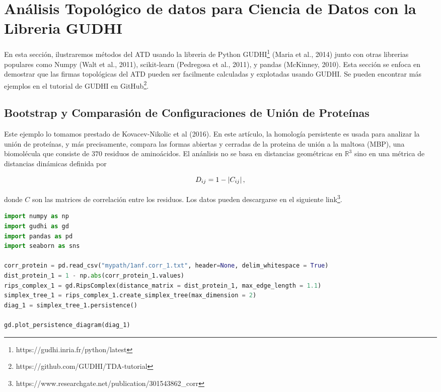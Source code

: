 \chapter{An\'alisis Topol\'ogico de datos para Ciencia de Datos con la Libreria GUDHI}

En esta secci\'on, ilustraremos m\'etodos del ATD usando la libreria de Python
GUDHI\footnote{https://gudhi.inria.fr/python/latest} (Maria et al., 2014\cite{Maria2014})
junto con otras librerias populares como Numpy (Walt et al., 2011\cite{Walt2011}),
scikit-learn (Pedregosa et al., 2011)\cite{Pedregosa2011},
y pandas (McKinney, 2010\cite{McKinney2010}).
Esta secci\'on se enfoca en demostrar que las firmas topol\'ogicas del ATD
pueden ser facilmente calculadas y explotadas usando GUDHI.
Se pueden encontrar m\'as ejemplos en el tutorial de GUDHI en
GitHub\footnote{https://github.com/GUDHI/TDA-tutorial}.

\section{Bootstrap y Comparasi\'on de Configuraciones de Uni\'on de Prote\'inas}

Este ejemplo lo tomamos prestado de Kovacev-Nikolic et al (2016)\cite{Kovacev2016}.
En este art\'iculo, la homolog\'ia persistente es usada para analizar la uni\'on de
prote\'inas, y m\'as precisamente, compara las formas abiertas y cerradas de la
proteina de uni\'on a la maltosa (MBP), una biomol\'ecula que consiste de
$370$ residuos de amino\'acidos.
El an\'anlisis no se basa en distancias geom\'etricas en $\mathbb{R}^{3}$
sino en una m\'etrica de distancias din\'amicas definida por

\begin{equation*}
    D_{ij}=1-\left|C_{ij}\right|,
\end{equation*}

donde $C$ son las matrices de correlaci\'on entre los residuos.
Los datos pueden descargarse en el siguiente
link\footnote{https://www.researchgate.net/publication/301543862\_corr}.

\begin{lstlisting}[language=Python]
import numpy as np
import gudhi as gd
import pandas as pd
import seaborn as sns

corr_protein = pd.read_csv("mypath/1anf.corr_1.txt", header=None, delim_whitespace = True)
dist_protein_1 = 1 - np.abs(corr_protein_1.values)
rips_complex_1 = gd.RipsComplex(distance_matrix = dist_protein_1, max_edge_length = 1.1)
simplex_tree_1 = rips_complex_1.create_simplex_tree(max_dimension = 2)
diag_1 = simplex_tree_1.persistence()

gd.plot_persistence_diagram(diag_1)
\end{lstlisting}

